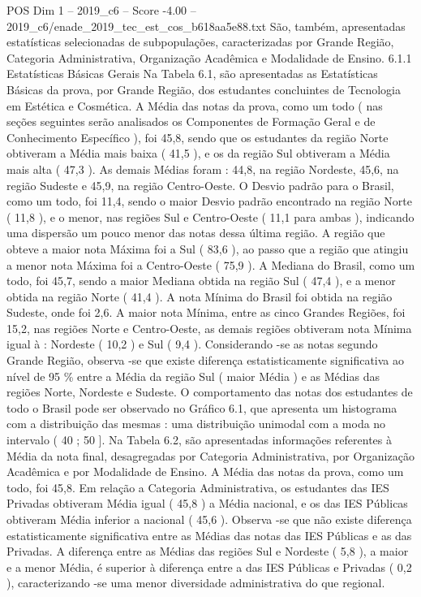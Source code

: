 \begin{textsample}{POS Dim 1 – 2019\_c6 – Score -4.00 – 2019\_c6/enade\_2019\_tec\_est\_cos\_b618aa5e88.txt}
São, também, apresentadas estatísticas selecionadas de subpopulações, caracterizadas por Grande Região, Categoria Administrativa, Organização Acadêmica e Modalidade de Ensino. 6.1.1 Estatísticas Básicas Gerais Na Tabela 6.1, são apresentadas as Estatísticas Básicas da prova, por Grande Região, dos estudantes concluintes de Tecnologia em Estética e Cosmética.
A Média das notas da prova, como um todo ( nas seções seguintes serão analisados os Componentes de Formação Geral e de Conhecimento Específico ), foi 45,8, sendo que os estudantes da região Norte obtiveram a Média mais baixa ( 41,5 ), e os da região Sul obtiveram a Média mais alta ( 47,3 ).
As demais Médias foram : 44,8, na região Nordeste, 45,6, na região Sudeste e 45,9, na região Centro-Oeste.
O Desvio padrão para o Brasil, como um todo, foi 11,4, sendo o maior Desvio padrão encontrado na região Norte ( 11,8 ), e o menor, nas regiões Sul e Centro-Oeste ( 11,1 para ambas ), indicando uma dispersão um pouco menor das notas dessa última região.
A região que obteve a maior nota Máxima foi a Sul ( 83,6 ), ao passo que a região que atingiu a menor nota Máxima foi a Centro-Oeste ( 75,9 ).
A Mediana do Brasil, como um todo, foi 45,7, sendo a maior Mediana obtida na região Sul ( 47,4 ), e a menor obtida na região Norte ( 41,4 ).
A nota Mínima do Brasil foi obtida na região Sudeste, onde foi 2,6.
A maior nota Mínima, entre as cinco Grandes Regiões, foi 15,2, nas regiões Norte e Centro-Oeste, as demais regiões obtiveram nota Mínima igual à : Nordeste ( 10,2 ) e Sul ( 9,4 ).
Considerando -se as notas segundo Grande Região, observa -se que existe diferença estatisticamente significativa ao nível de 95 \% entre a Média da região Sul ( maior Média ) e as Médias das regiões Norte, Nordeste e Sudeste.
O comportamento das notas dos estudantes de todo o Brasil pode ser observado no Gráfico 6.1, que apresenta um histograma com a distribuição das mesmas : uma distribuição unimodal com a moda no intervalo ( 40 ; 50 ].
Na Tabela 6.2, são apresentadas informações referentes à Média da nota final, desagregadas por Categoria Administrativa, por Organização Acadêmica e por Modalidade de Ensino.
A Média das notas da prova, como um todo, foi 45,8.
Em relação a Categoria Administrativa, os estudantes das IES Privadas obtiveram Média igual ( 45,8 ) a Média nacional, e os das IES Públicas obtiveram Média inferior a nacional ( 45,6 ).
Observa -se que não existe diferença estatisticamente significativa entre as Médias das notas das IES Públicas e as das Privadas.
A diferença entre as Médias das regiões Sul e Nordeste ( 5,8 ), a maior e a menor Média, é superior à diferença entre a das IES Públicas e Privadas ( 0,2 ), caracterizando -se uma menor diversidade administrativa do que regional.

\end{textsample}
